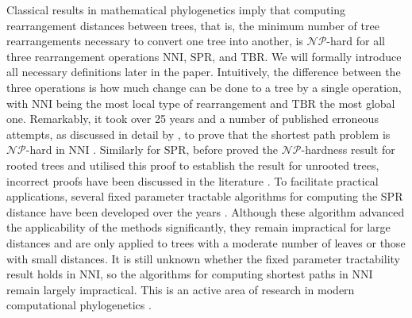 \documentclass[11pt]{amsart}
\newcommand{\nni}{\mathrm{NNI}}
\newcommand{\spr}{\mathrm{SPR}}
\newcommand{\tbr}{\mathrm{TBR}}
\newcommand{\np}{\mathcal{NP}}
\newcommand{\summary}[1]{} %
\begin{document}
\summary{Motivation: However, all known graph-based tree rearrangement distances, including NNI, are NP-hard, and it took many years and paper to prove that; so approach such as practical FPT algorithms is an active area of research to overcome the computational (cite Whidden).}
Classical results in mathematical phylogenetics imply that computing rearrangement distances between trees, that is, the minimum number of tree rearrangements necessary to convert one tree into another, is $\np$-hard \autocite{Dasgupta2000-xa, Bordewich2005-nx, Hickey2008-wv, Allen2001-ky} for all three rearrangement operations $\nni$, $\spr$, and $\tbr$.
We will formally introduce all necessary definitions later in the paper.
Intuitively, the difference between the three operations is how much change can be done to a tree by a single operation, with $\nni$ being the most local type of rearrangement and $\tbr$ the most global one.
Remarkably, it took over 25 years and a number of published erroneous attempts, as discussed in detail by \textcite{Dasgupta2000-xa}, to prove that the shortest path problem is $\np$-hard in $\nni$ \autocite{Dasgupta2000-xa}.
Similarly for $\spr$, before \textcite{Bordewich2005-nx} proved the $\np$-hardness result for rooted trees and \textcite{Hickey2008-wv} utilised this proof to establish the result for unrooted trees, incorrect proofs have been discussed in the literature \autocite{Hein1996-em, Allen2001-ky}.
To facilitate practical applications, several fixed parameter tractable algorithms for computing the $\spr$ distance have been developed over the years \autocite{Whidden2010-bw, Bordewich2005-nx, Whidden2018-fw}.
Although these algorithm advanced the applicability of the methods significantly, they remain impractical for large distances and are only applied to trees with a moderate number of leaves or those with small distances.
It is still unknown whether the fixed parameter tractability result holds in $\nni$, so the algorithms for computing shortest paths in $\nni$ remain largely impractical.
This is an active area of research in modern computational phylogenetics \autocite{Gavryushkin2018-ol}.
\end{document}
